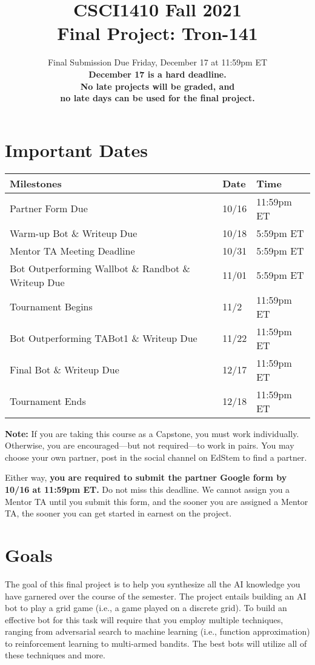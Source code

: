 \documentclass{article}
\title{CSCI1410 Fall 2021 \\
Final Project: Tron-141}
\date{Final Submission Due Friday, December 17 at 11:59pm ET \\ [1ex]
  \textbf{December 17 is a hard deadline. \\
    No late projects will be graded, and \\
    no late days can be used for the final project. \\}}
\begin{document}
\maketitle


\section{Important Dates}

\begin{center}
\begin{tabular}{|l||l|l|}
\hline    
Milestones & Date & Time \\
\hline    
\hline    
Partner Form Due                 & 10/16 & 11:59pm ET \\
Warm-up Bot \& Writeup Due       & 10/18  & 5:59pm ET \\ 
Mentor TA Meeting Deadline       & 10/31  & 5:59pm ET \\ 
Bot Outperforming Wallbot \& Randbot \& Writeup Due & 11/01 & 5:59pm ET \\ 
Tournament Begins                & 11/2  & 11:59pm ET \\
Bot Outperforming TABot1 \& Writeup Due & 11/22  & 11:59pm ET \\
Final Bot \& Writeup Due         & 12/17 & 11:59pm ET \\
Tournament Ends                  & 12/18 & 11:59pm ET \\
\hline    
\end{tabular}
\end{center}

\textbf{Note:} If you are taking this course as a Capstone, you must work individually.
Otherwise, you are encouraged---but not required---to work in pairs.
You may choose your own partner, post in the social channel on EdStem to find a partner.

Either way, \textbf{you are required to submit the partner Google form by 10/16 at 11:59pm ET.}  Do not miss this
deadline.  We cannot assign you a Mentor TA until you submit this
form, and the sooner you are assigned a Mentor TA, the sooner you can
get started in earnest on the project.

\section{Goals}
The goal of this final project is to help you synthesize all the AI
knowledge you have garnered over the course of the semester.  The
project entails building an AI bot to play a grid game (i.e., a game
played on a discrete grid).  To build an effective bot for this task
will require that you employ multiple techniques, ranging from
adversarial search to machine learning (i.e., function approximation)
to reinforcement learning to multi-armed bandits.  The best bots will
utilize all of these techniques and more.
\end{document}
